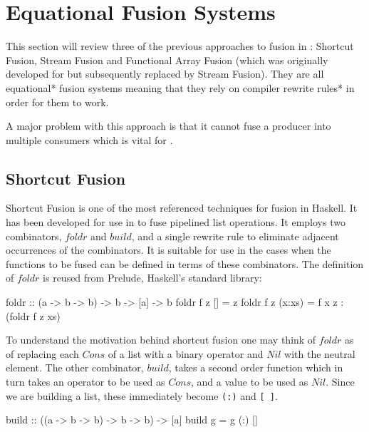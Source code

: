 \documentclass[preamble.tex]{subfiles}
\begin{document}
\chapter{Equational Fusion Systems}
\label{sec:Equational-Fusion-Systems}
\ieqfusion{}

This section will review three of the previous approaches to fusion in \Haskell: Shortcut Fusion, Stream Fusion and Functional Array Fusion (which was originally developed for \DPH but subsequently replaced by Stream Fusion). They are all \*equational* fusion systems meaning that they rely on compiler \*rewrite rules* in order for them to work.

A major problem with this approach is that it cannot fuse a producer into multiple consumers which is vital for .


\clearpage

\section{Shortcut Fusion}
\label{sec:Shortcut-Fusion}

Shortcut Fusion \cite{GLP93} is one of the most referenced techniques for fusion in Haskell. It has been developed for use in \GHC to fuse pipelined list operations. It employs two combinators, $foldr$ and $build$, and a single rewrite rule to eliminate adjacent occurrences of the combinators. It is suitable for use in the cases when the functions to be fused can be defined in terms of these combinators. The definition of $foldr$ is reused from Prelude, Haskell's standard library:

\begin{hscode}
foldr :: (a -> b -> b) -> b -> [a] -> b
foldr f z []     = z
foldr f z (x:xs) = f x z : (foldr f z xs)
\end{hscode}


To understand the motivation behind shortcut fusion one may think of $foldr$ as of replacing each $Cons$ of a list with a binary operator and $Nil$ with the neutral element. The other combinator, $build$, takes a second order function which in turn takes an operator to be used as $Cons$, and a value to be used as $Nil$. Since we are building a list, these immediately become \texttt{(:)} and \texttt{{[} {]}}.

\begin{hscode}
build :: ((a -> b -> b) -> b -> b) -> [a]
build g = g (:) []
\end{hscode}
\end{document}
